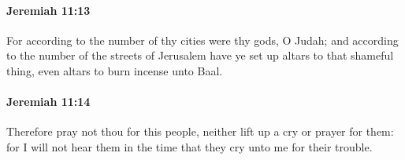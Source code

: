 		\paragraph{Jeremiah 11:13} %
			\label{JEREMIAH-11-13}

			For according to the number of thy cities were thy gods, O Judah; and according to the number of the streets of Jerusalem have ye set up altars to that shameful thing, even altars to burn incense unto Baal.


		\paragraph{Jeremiah 11:14} %
			\label{JEREMIAH-11-14}

			Therefore pray not thou for this people, neither lift up a cry or prayer for them: for I will not hear them in the time that they cry unto me for their trouble.

